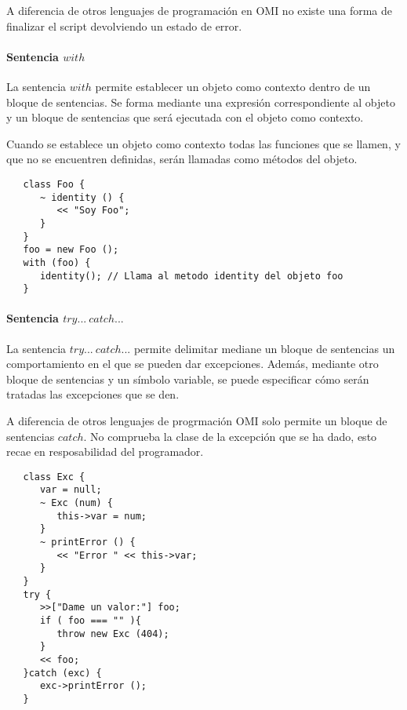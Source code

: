 A diferencia de otros lenguajes de programación en OMI no existe una forma de finalizar el script 
devolviendo un estado de error.

\paragraph{Sentencia $with$} \label{sec:stmt_with}

La sentencia $with$ permite establecer un objeto como contexto dentro de un bloque de sentencias. Se forma mediante
una expresión correspondiente al objeto y un bloque de sentencias que será ejecutada con el objeto como contexto. 

Cuando se establece un objeto como contexto todas las funciones que se llamen, y que no se encuentren definidas, serán 
llamadas como métodos del objeto. \\

\begin{lstlisting}
   class Foo {
      ~ identity () {
         << "Soy Foo";
      } 
   }
   foo = new Foo ();
   with (foo) {
      identity(); // Llama al metodo identity del objeto foo
   }
\end{lstlisting}

\paragraph{Sentencia $try...\ catch...$} \label{sec:stmt_try}

La sentencia $try...\ catch...$ permite delimitar mediane un bloque de sentencias 
un comportamiento en el que se pueden dar excepciones. Además, mediante otro 
bloque de sentencias y un símbolo variable, se puede especificar cómo serán tratadas
las excepciones que se den.

A diferencia de otros lenguajes de progrmación OMI solo permite un bloque de 
sentencias $catch$. No comprueba la clase de la excepción que se ha dado, esto recae
en resposabilidad del programador. \\

\begin{lstlisting}
   class Exc {
      var = null;
      ~ Exc (num) {
         this->var = num;
      }
      ~ printError () {
         << "Error " << this->var;
      }
   }
   try {
      >>["Dame un valor:"] foo;
      if ( foo === "" ){
         throw new Exc (404);
      } 
      << foo;
   }catch (exc) {
      exc->printError ();
   }
\end{lstlisting}

